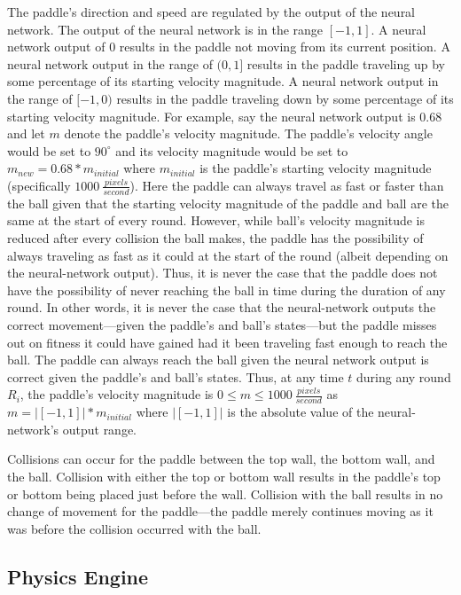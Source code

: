 \documentclass[a4paper,10pt]{article}
\begin{document}
The paddle's direction and speed are regulated by the output of the neural network. The output of the neural network is in the range $[-1,1]$. A neural network output of $0$ results in the paddle not moving from its current position. A neural network output in the range of $(0,1]$ results in the paddle traveling up by some percentage of its starting velocity magnitude. A neural network output in the range of $[-1,0)$ results in the paddle traveling down by some percentage of its starting velocity magnitude. For example, say the neural network output is $0.68$ and let $m$ denote the paddle's velocity magnitude. The paddle's velocity angle would be set to $90^\circ$ and its velocity magnitude would be set to $m_{new}=0.68*m_{initial}$ where $m_{initial}$ is the paddle's starting velocity magnitude (specifically $1000 \ \frac{pixels}{second}$). Here the paddle can always travel as fast or faster than the ball given that the starting velocity magnitude of the paddle and ball are the same at the start of every round. However, while ball's velocity magnitude is reduced after every collision the ball makes, the paddle has the possibility of always traveling as fast as it could at the start of the round (albeit depending on the neural-network output). Thus, it is never the case that the paddle does not have the possibility of never reaching the ball in time during the duration of any round. In other words, it is never the case that the neural-network outputs the correct movement---given the paddle's and ball's states---but the paddle misses out on fitness it could have gained had it been traveling fast enough to reach the ball. The paddle can always reach the ball given the neural network output is correct given the paddle's and ball's states. Thus, at any time $t$ during any round $R_i$, the paddle's velocity magnitude is $0\leq m \leq 1000 \ \frac{pixels}{second}$ as $m = \left|[-1,1]\right| * m_{initial}$ where $\left|[-1,1]\right|$ is the absolute value of the neural-network's output range.    

Collisions can occur for the paddle between the top wall, the bottom wall, and the ball. Collision with either the top or bottom wall results in the paddle's top or bottom being placed just before the wall. Collision with the ball results in no change of movement for the paddle---the paddle merely continues moving as it was before the collision occurred with the ball.

\subsection{Physics Engine}
\end{document}
